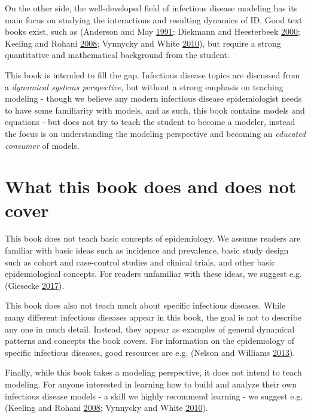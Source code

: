 \documentclass[]{book}
\theoremstyle{definition}
\theoremstyle{definition}
\theoremstyle{definition}
\theoremstyle{remark}
\begin{document}
On the other side, the well-developed field of infectious disease
modeling has its main focus on studying the interactions and resulting
dynamics of ID. Good text books exist, such as (Anderson and May
\protect\hyperlink{ref-anderson91}{1991}; Diekmann and Heesterbeek
\protect\hyperlink{ref-diekmann00}{2000}; Keeling and Rohani
\protect\hyperlink{ref-keeling08}{2008}; Vynnycky and White
\protect\hyperlink{ref-vynnycky10}{2010}), but require a strong
quantitative and mathematical background from the student.

This book is intended to fill the gap. Infectious disease topics are
discussed from a \emph{dynamical systems perspective}, but without a
strong emphasis on teaching modeling - though we believe any modern
infectious disease epidemiologist needs to have some familiarity with
models, and as such, this book contains models and equations - but does
not try to teach the student to become a modeler, instead the focus is
on understanding the modeling perspective and becoming an \emph{educated
consumer} of models.

\hypertarget{what-this-book-does-and-does-not-cover}{%
\section{What this book does and does not
cover}\label{what-this-book-does-and-does-not-cover}}

This book does not teach basic concepts of epidemiology. We assume
readers are familiar with basic ideas such as incidence and prevalence,
basic study design such as cohort and case-control studies and clinical
trials, and other basic epidemiological concepts. For readers unfamiliar
with these ideas, we suggest e.g. (Giesecke
\protect\hyperlink{ref-giesecke17}{2017}).

This book does also not teach much about specific infectious diseases.
While many different infectious diseases appear in this book, the goal
is not to describe any one in much detail. Instead, they appear as
examples of general dynamical patterns and concepts the book covers. For
information on the epidemiology of specific infectious diseases, good
resources are e.g. (Nelson and Williams
\protect\hyperlink{ref-nelson13}{2013}).

Finally, while this book takes a modeling perspective, it does not
intend to teach modeling. For anyone interested in learning how to build
and analyze their own infectious disease models - a skill we highly
recommend learning - we suggest e.g. (Keeling and Rohani
\protect\hyperlink{ref-keeling08}{2008}; Vynnycky and White
\protect\hyperlink{ref-vynnycky10}{2010}).
\end{document}
